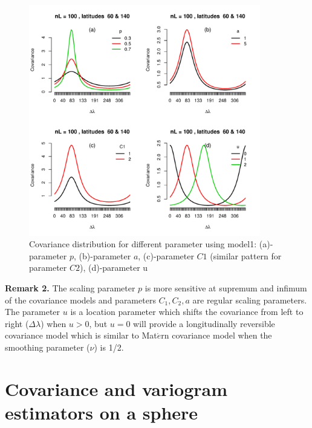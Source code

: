 			\begin{figure}[H]
				\centering
				\includegraphics[width=0.9\textwidth]{graphs/parameters_model1_2}
				\caption[Covariance distribution for different parameter using model1:] {Covariance distribution for different parameter using model1:  (a)-parameter $p$, (b)-parameter $a$, (c)-parameter $C1$ (similar pattern for parameter $C2$), (d)-parameter u}
				\label{fig_parameter_comp}
			\end{figure}
			
{\bf Remark 2.} The scaling parameter $p$ is more sensitive at supremum and infimum of the covariance models and parameters $C_1, C_2, a$ are regular scaling parameters. The parameter $u$ is a location parameter which shifts the covariance from left to right ($\Delta\lambda$) when $u>0$, but $u=0$ will provide a longitudinally reversible covariance model which is similar to Mat$\acute{e}$rn covariance model when the smoothing parameter ($\nu$) is 1/2.\\


			\section{Covariance and variogram estimators on a sphere}

